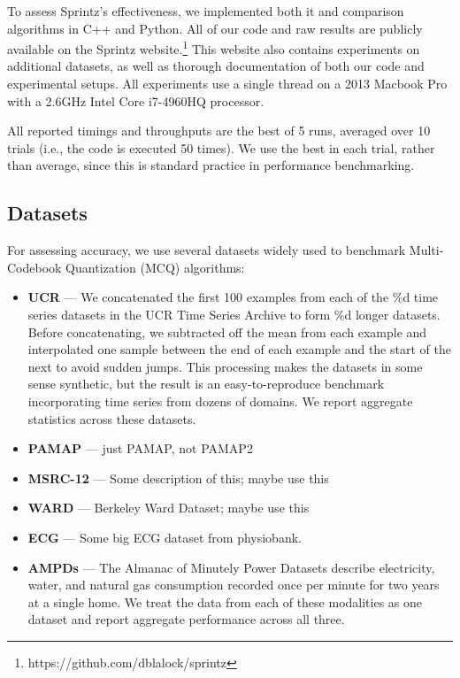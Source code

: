 
To assess Sprintz's effectiveness, we implemented both it and comparison algorithms in C++ and Python. All of our code and raw results are publicly available on the Sprintz website.\footnote{https://github.com/dblalock/sprintz} This website also contains experiments on additional datasets, as well as thorough documentation of both our code and experimental setups. All experiments use a single thread on a 2013 Macbook Pro with a 2.6GHz Intel Core i7-4960HQ processor.

All reported timings and throughputs are the best of 5 runs, averaged over 10 trials (i.e., the code is executed 50 times). We use the best in each trial, rather than average, since this is standard practice in performance benchmarking.

\subsection{Datasets}

For assessing accuracy, we use several datasets widely used to benchmark Multi-Codebook Quantization (MCQ) algorithms:
\begin{itemize}[leftmargin=4mm]
\item \textbf{UCR} \cite{ucrTimeSeries} --- We concatenated the first 100 examples from each of the \%d time series datasets in the UCR Time Series Archive \cite{ucrTimeSeries} to form \%d longer datasets. Before concatenating, we subtracted off the mean from each example and interpolated one sample between the end of each example and the start of the next to avoid sudden jumps. This processing makes the datasets in some sense synthetic, but the result is an easy-to-reproduce benchmark incorporating time series from dozens of domains. We report aggregate statistics across these datasets.
\item \textbf{PAMAP} \cite{PAMAP} --- just PAMAP, not PAMAP2
\item \textbf{MSRC-12} \cite{msrc} --- Some description of this; maybe use this
\item \textbf{WARD} \cite{ward} --- Berkeley Ward Dataset; maybe use this
\item \textbf{ECG} \cite{physiobank} --- Some big ECG dataset from physiobank.
\item \textbf{AMPDs} \cite{ampds} --- The Almanac of Minutely Power Datasets describe electricity, water, and natural gas consumption recorded once per minute for two years at a single home. We treat the data from each of these modalities as one dataset and report aggregate performance across all three.
\end{itemize}

